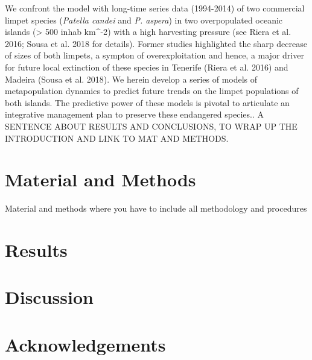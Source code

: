 \documentclass[12pt]{article}
\begin{document}
We confront the model with long-time series data (1994-2014) of two commercial limpet species (\textit{Patella candei} and \textit{P. aspera}) in two overpopulated oceanic islands (> 500 inhab km^{-2}) with a high harvesting pressure (see Riera et al. 2016; Sousa et al. 2018 for details). Former studies highlighted the sharp decrease of sizes of both limpets, a sympton of overexploitation and hence, a major driver for future local extinction of these species in Tenerife (Riera et al. 2016) and Madeira (Sousa et al. 2018). We herein develop a series of models  of metapopulation dynamics to predict future trends on the limpet populations of both islands. The predictive power of these models is pivotal to articulate an integrative management plan to preserve these endangered species.. A SENTENCE ABOUT RESULTS AND CONCLUSIONS, TO WRAP UP THE INTRODUCTION AND LINK TO MAT AND METHODS.

\section{Material and Methods}

Material and methods where you have to include all methodology and procedures

\section{Results}

\section{Discussion}

\section{Acknowledgements}
\end{document}
